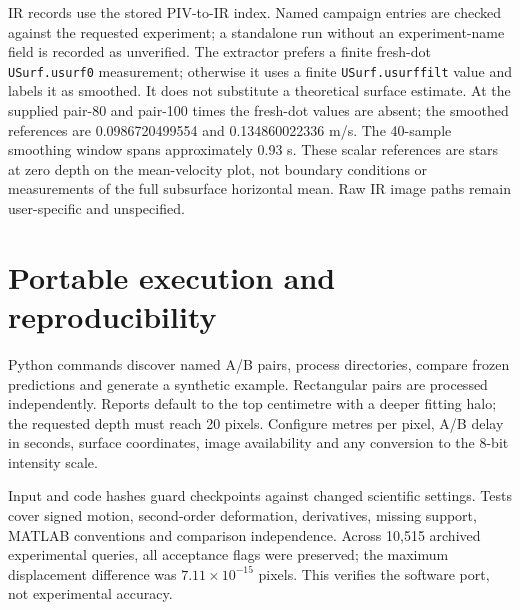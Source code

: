 \documentclass[11pt]{article}
\begin{document}
IR records use the stored PIV-to-IR index. Named campaign entries are checked against the requested experiment; a standalone run without an experiment-name field is recorded as unverified. The extractor prefers a finite fresh-dot \texttt{USurf.usurf0} measurement; otherwise it uses a finite \texttt{USurf.usurffilt} value and labels it as smoothed. It does not substitute a theoretical surface estimate. At the supplied pair-80 and pair-100 times the fresh-dot values are absent; the smoothed references are 0.0986720499554 and 0.134860022336 m/s. The 40-sample smoothing window spans approximately 0.93 s. These scalar references are stars at zero depth on the mean-velocity plot, not boundary conditions or measurements of the full subsurface horizontal mean. Raw IR image paths remain user-specific and unspecified.

\section{Portable execution and reproducibility}
Python commands discover named A/B pairs, process directories, compare frozen predictions and generate a synthetic example. Rectangular pairs are processed independently. Reports default to the top centimetre with a deeper fitting halo; the requested depth must reach 20 pixels. Configure metres per pixel, A/B delay in seconds, surface coordinates, image availability and any conversion to the 8-bit intensity scale.

Input and code hashes guard checkpoints against changed scientific settings. Tests cover signed motion, second-order deformation, derivatives, missing support, MATLAB conventions and comparison independence. Across 10,515 archived experimental queries, all acceptance flags were preserved; the maximum displacement difference was $7.11\times10^{-15}$ pixels. This verifies the software port, not experimental accuracy.
\end{document}
